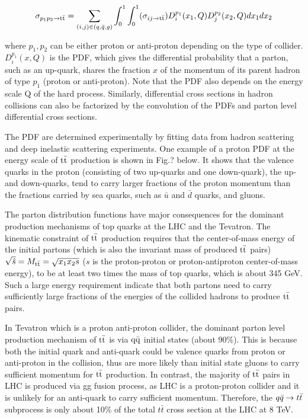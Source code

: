 \begin{equation}
\sigma_{p_1p_2\rightarrow \mathrm{t}\bar{\mathrm{t}}} = \sum_{(i,j)\in(q,\bar q,g)}\int_{0}^{1}\int_{0}^{1}(\sigma_{ij\rightarrow\mathrm{t}\bar{\mathrm{t}}})D_i^{p_1}(x_1,Q)D_j^{p_2}(x_2,Q)dx_1dx_2  
\end{equation}  

where $p_1,p_2$ can be either proton or anti-proton depending on the type of collider. $D_i^{p_1}(x,Q)$ is the PDF, which gives the differential probability that a parton, such as an up-quark, shares the fraction $x$ of the momentum of its parent hadron of type $p_1$ (proton or anti-proton). Note that the PDF also depends on the energy scale Q of the hard process. Similarly, differential cross sections in hadron collisions can also be factorized by the convolution of the PDFs and parton level differential cross sections.

The PDF are determined experimentally by fitting data from hadron scattering and deep inelastic scattering experiments. One example of a proton PDF at the energy scale of $\mathrm{t}\bar{\mathrm{t}}$ production is shown in Fig.? below. It shows that the valence quarks in the proton (consisting of two up-quarks and one down-quark), the up- and down-quarks, tend to carry larger fractions of the proton momentum than the fractions carried by sea quarks, such as $\bar u$ and $\bar d$ quarks, and gluons.  

The parton distribution functions have major consequences for the dominant production mechanisms of top quarks at the LHC and the Tevatron. The kinematic constraint of $\mathrm{t}\bar{\mathrm{t}}$ production requires that the center-of-mass energy of the initial partons (which is also the invariant mass of produced $\mathrm{t}\bar{\mathrm{t}}$ pairs) $\sqrt{\hat s}=M_{\mathrm{t\bar t}}=\sqrt{x_1x_2s}$ ($s$ is the proton-proton or proton-antiproton center-of-mass energy), to be at least two times the mass of top quarks, which is about 345 GeV. Such a large energy requirement indicate that both partons need to carry sufficiently large fractions of the energies of the collided hadrons to produce $\mathrm{t}\bar{\mathrm{t}}$ pairs.  

In Tevatron which is a proton anti-proton collider, the dominant parton level production mechanism of $\mathrm{t}\bar{\mathrm{t}}$ is via $\mathrm{q \bar{q}}$ initial states (about 90\%). This is because both the initial quark and anti-quark could be valence quarks from proton or anti-proton in the collision, thus are more likely than initial state gluons to carry sufficient momentum for $\mathrm{t}\bar{\mathrm{t}}$ production. In contrast, the majority of $\mathrm{t}\bar{\mathrm{t}}$ pairs in LHC is produced via gg fusion process, as LHC is a proton-proton collider and it is unlikely for an anti-quark to carry sufficient momentum. Therefore, the $q\bar q \rightarrow t \bar t$ subprocess is only about 10\% of the total $t\bar t$ cross section at the LHC at 8 TeV. 

